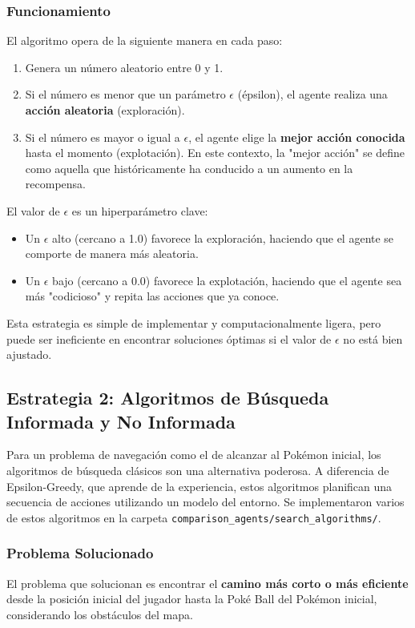 \documentclass[12pt, oneside, openany]{book}
\begin{document}
\subsubsection{Funcionamiento}
El algoritmo opera de la siguiente manera en cada paso:
\begin{enumerate}
    \item Genera un número aleatorio entre 0 y 1.
    \item Si el número es menor que un parámetro $\epsilon$ (épsilon), el agente realiza una \textbf{acción aleatoria} (exploración).
    \item Si el número es mayor o igual a $\epsilon$, el agente elige la \textbf{mejor acción conocida} hasta el momento (explotación). En este contexto, la "mejor acción" se define como aquella que históricamente ha conducido a un aumento en la recompensa.
\end{enumerate}
El valor de $\epsilon$ es un hiperparámetro clave:
\begin{itemize}
    \item Un $\epsilon$ alto (cercano a 1.0) favorece la exploración, haciendo que el agente se comporte de manera más aleatoria.
    \item Un $\epsilon$ bajo (cercano a 0.0) favorece la explotación, haciendo que el agente sea más "codicioso" y repita las acciones que ya conoce.
\end{itemize}

Esta estrategia es simple de implementar y computacionalmente ligera, pero puede ser ineficiente en encontrar soluciones óptimas si el valor de $\epsilon$ no está bien ajustado.

\subsection{Estrategia 2: Algoritmos de Búsqueda Informada y No Informada}
Para un problema de navegación como el de alcanzar al Pokémon inicial, los algoritmos de búsqueda clásicos son una alternativa poderosa. A diferencia de Epsilon-Greedy, que aprende de la experiencia, estos algoritmos planifican una secuencia de acciones utilizando un modelo del entorno. Se implementaron varios de estos algoritmos en la carpeta \texttt{comparison\_agents/search\_algorithms/}.

\subsubsection{Problema Solucionado}
El problema que solucionan es encontrar el \textbf{camino más corto o más eficiente} desde la posición inicial del jugador hasta la Poké Ball del Pokémon inicial, considerando los obstáculos del mapa.
\end{document}
